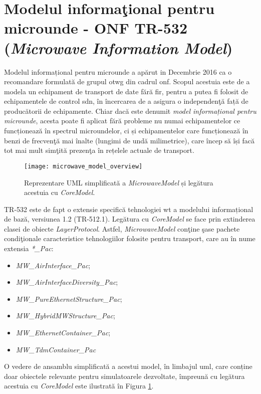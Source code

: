 \section{Modelul informaţional pentru microunde - ONF TR-532 (\textit{Microwave Information Model})}

Modelul informațional pentru microunde \cite{onftr532} a apărut in Decembrie 2016 ca o recomandare formulată de grupul \gls{otwg} din cadrul \gls{onf}. Scopul acestuia este de a modela un echipament de transport de date fără fir, pentru a putea fi folosit de echipamentele de control \gls{sdn}, în încercarea de a asigura o independenţă față de producătorii de echipamente. Chiar dacă este denumit \textit{model informațional pentru microunde}, acesta poate fi aplicat fără probleme nu numai echipamentelor ce funcționează în spectrul microundelor, ci și echipamentelor care funcționează în benzi de frecvenţă mai înalte (lungimi de undă milimetrice), care încep să își facă tot mai mult simţită prezenţa în rețelele actuale de transport.

\begin{figure}[t]
	\centering
	\texttt{[image: microwave\_model\_overview]}
	\caption{Reprezentare UML simplificată a \textit{MicrowaveModel} și legătura acestuia cu \textit{CoreModel}.}
	\label{fig:microwave_model}
\end{figure}


TR-532 este de fapt o extensie specifică tehnologiei \gls{wt} a modelului informațional de bază, versiunea 1.2 (TR-512.1). Legătura cu \textit{CoreModel} se face prin extinderea clasei de obiecte \textit{LayerProtocol}. Astfel, \textit{MicrowaveModel} conţine şase pachete condiţionale caracteristice tehnologiilor folosite pentru transport, care au în nume extensia \textit{*\_Pac}: 

\begin{itemize}
	\item \textit{MW\_AirInterface\_Pac};
	\item \textit{MW\_AirInterfaceDiversity\_Pac};
	\item \textit{MW\_PureEthernetStructure\_Pac};
	\item \textit{MW\_HybridMWStructure\_Pac};
	\item \textit{MW\_EthernetContainer\_Pac};
	\item \textit{MW\_TdmContainer\_Pac}
\end{itemize}

O vedere de ansamblu simplificată a acestui model, în limbajul \gls{uml}, care conține doar obiectele relevante pentru simulatoarele dezvoltate, împreună cu legătura acestuia cu \textit{CoreModel} este ilustrată în Figura \ref{fig:microwave_model}.

